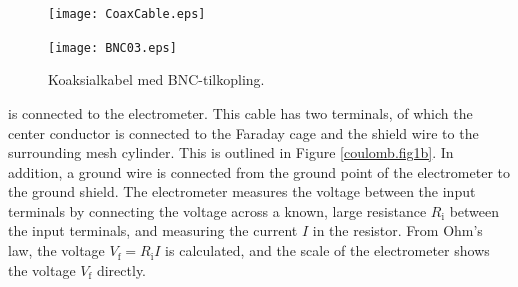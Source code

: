 \documentclass[../Elmag-labhefte-2020.tex]{subfiles}
\begin{document}
\begin{figure}[!h]
    \begin{minipage}[b]{0.5\linewidth}
        \centering
        \texttt{[image: CoaxCable.eps]}
        \caption{%
            Tverrsnitt av en koaksialkabel.
        }
        \label{fig:CoaxCable}
    \end{minipage}
    \hspace{0.15cm}
    \begin{minipage}[b]{0.5\linewidth}
        \centering
        \texttt{[image: BNC03.eps]}
        \caption{%
            Koaksialkabel med BNC-tilkopling.
        }
        \label{fig:BNC03}
    \end{minipage}
\end{figure}
is connected to the electrometer. This cable has two terminals, of which the center conductor is connected to the Faraday cage and the shield wire to the surrounding mesh cylinder. This is outlined in Figure \ref{coulomb.fig1b}. In addition, a ground wire is connected from the ground point of the electrometer to the ground shield. The electrometer measures the voltage between the input terminals by connecting the voltage across a known, large resistance $R_\text{i}$ between the input terminals, and measuring the current $I$ in the resistor. From Ohm's law, the voltage $V_\text{f} = R_\text{i}  I$ is calculated, and the scale of the electrometer shows the voltage $V_\text{f}$ directly.
\end{document}
